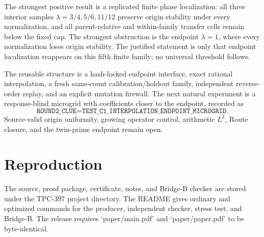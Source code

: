 \documentclass[10pt]{article}
\begin{document}
The strongest positive result is a replicated finite phase localization: all
three interior samples $\lambda=3/4,5/6,11/12$ preserve origin stability
under every normalization, and all parent-relative and within-family transfer
cells remain below the fixed cap.  The strongest obstruction is the endpoint
$\lambda=1$, where every normalization loses origin stability.  The justified
statement is only that endpoint localization reappears on this fifth finite
family; no universal threshold follows.

The reusable structure is a hash-locked endpoint interface, exact rational
interpolation, a fresh same-count calibration/holdout family, independent
reverse-order replay, and an explicit mutation firewall.  The next natural
experiment is a response-blind microgrid with coefficients closer to the
endpoint, recorded as
\[
 \texttt{ROUND2\_CLUE=TEST\_C1\_INTERPOLATION\_ENDPOINT\_MICROGRID}.
\]
Source-valid origin uniformity, growing operator control, arithmetic $L^2$,
Route closure, and the twin-prime endpoint remain open.

\section*{Reproduction}

The source, proof package, certificate, notes, and Bridge-B checker are stored
under the TPC-397 project directory.  The README gives ordinary and optimized
commands for the producer, independent checker, stress test, and Bridge-B.
The release requires `paper/main.pdf' and `paper/paper.pdf' to be byte-identical.
\end{document}
